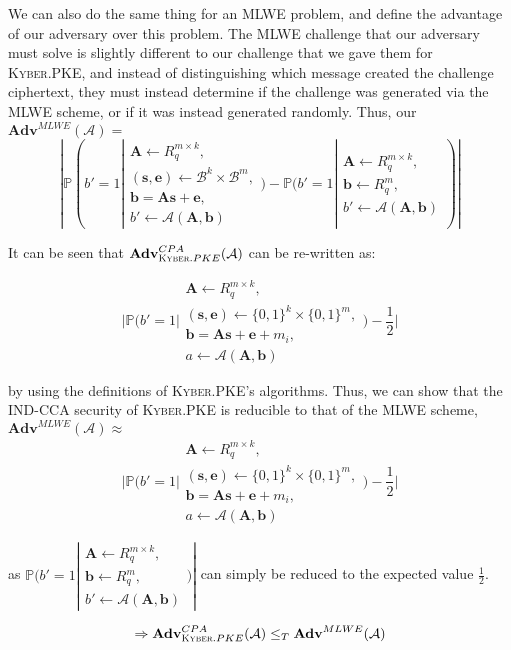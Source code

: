 \documentclass[a4paper, 10pt]{article}
\theoremstyle{definition}
\begin{document}
We can also do the same thing for an MLWE problem, and define the advantage of our adversary over this problem. The MLWE challenge that our adversary must solve is slightly different to our challenge that we gave them for \textsc{Kyber}.PKE, and instead of distinguishing which message created the challenge ciphertext, they must instead determine if the challenge was generated via the MLWE scheme, or if it was instead generated randomly. Thus, our $\mathbf{Adv}^{MLWE}(\mathcal{A})=$
\[ |\mathbb{P}(b'=1|\substack{\mathbf{A}\leftarrow R^{m\times k}_q,\\ (\mathbf{s, e}) \leftarrow \mathcal{B}^k \times \mathcal{B}^m,\\ \mathbf{b} = \mathbf{As+e},\\ b'\leftarrow \mathcal{A}(\mathbf{A,b})}) - \mathbb{P}(b'=1|\substack{\mathbf{A}\leftarrow R^{m\times k}_q ,\\\mathbf{b}\leftarrow R^m_q,\\ b'\leftarrow \mathcal{A}(\mathbf{A,b})})| \]

It can be seen that $\mathbf{Adv}^{CPA}_{\textsc{Kyber}.PKE}(\mathcal{A})$ can be re-written as:

\[ |\mathbb{P}(b'=1|\substack{\mathbf{A} \leftarrow R^{m\times k}_q ,\\ (\mathbf{s, e}) \leftarrow \{0, 1\}^k \times \{0,1\}^m ,\\ \mathbf{b} = \mathbf{As} + \mathbf{e} + m_i ,\\ a \leftarrow \mathcal{A}(\mathbf{A,b})}) - \frac{1}{2}| \]

by using the definitions of \textsc{Kyber}.PKE's algorithms. Thus, we can show that the IND-CCA security of \textsc{Kyber}.PKE is reducible to that of the MLWE scheme, $\mathbf{Adv}^{MLWE}(\mathcal{A})\approx $
\[ |\mathbb{P}(b'=1|\substack{\mathbf{A} \leftarrow R^{m\times k}_q ,\\ (\mathbf{s, e}) \leftarrow \{0, 1\}^k \times \{0,1\}^m ,\\ \mathbf{b} = \mathbf{As} + \mathbf{e} + m_i ,\\ a \leftarrow \mathcal{A}(\mathbf{A,b})}) - \frac{1}{2}| \]

as $\mathbb{P}(b'=1|\substack{\mathbf{A}\leftarrow R^{m\times k}_q ,\\\mathbf{b}\leftarrow R^m_q,\\ b'\leftarrow \mathcal{A}(\mathbf{A,b})})|$ can simply be reduced to the expected value $\frac{1}{2}$.

\[ \Rightarrow \mathbf{Adv}^{CPA}_{\textsc{Kyber}.PKE}(\mathcal{A}) \leq_T \mathbf{Adv}^{MLWE}(\mathcal{A}) \]
\end{document}
